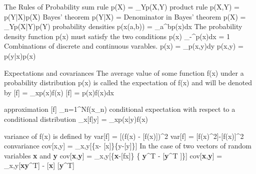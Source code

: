 The Rules of Probability
sum rule
                                  p(X) = \sum_{Y}p(X,Y)
product rule
                                  p(X,Y) = p(Y|X)p(X)
Bayes' theorem
                                  p(Y|X) = 
Denominator in Bayes' theorem
                                  p(X) = \sum_Y{p(X|Y)p(Y)}
probability densities
                                  p(x\in (a,b)) = \int_{a}^{b}p(x)dx
The probability density function p(x) must satisfy the two conditions
                                  p(x) 
                                  \int_{-\infty}^{\infty}p(x)dx = 1
Combinations of discrete and continuous varables.
                                  p(x) = \int_p(x,y)dy
                                  p(x,y) = p(y|x)p(x)
                                  
Expectations and covariances
The average value of some function f(x) under a probability distribution p(x) is called the expectation of f(x) and
will be denoted by 
                                  [f] = \sum_{x}p(x)f(x)
                                  [f] = \int p(x)f(x)dx
                                  
approximation
                                  [f] \simeq {}\sum_{n=1}^{N}{f(x_n)}
conditional expectation with respect to a conditional distribution                                
                                  _x[f|y] = \sum_{x}p(x|y)f(x)

variance of f(x) is defined by
                                  var[f] = [(f(x) - [f(x)])^2
                                  var[f] = [f(x)^2]-[f(x)]^2
convariance 
                                  cov[x,y] = _{x,y}[\{x- [x]\}\{y-[y]\}]
In the case of two vectors of random variables \textbf{x} and \textbf{y}
cov[\textbf{x},\textbf{y}] = _{x,y}[\{\textbf{x}-[\textb                          f{x}]\} \{ \textbf{y}^T - [\textbf{y}^T ]\}]
cov[\textbf{x},\textbf{y}] = _{x,y}[\textbf{x}\textbf{y}^T] - [\textbf{x}] [\textbf{y}^T]

